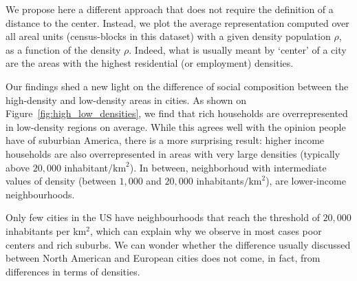 We propose here a different approach that does not require the
definition of a distance to the center. Instead, we plot the average
representation computed over all areal units (census-blocks in this
dataset) with a given density population $\rho$, as a function of the density
$\rho$. Indeed, what is usually meant by `center' of a city are the areas with
the highest residential (or employment) densities. 

Our findings shed a new light on the difference of social composition
between the high-density and low-density areas in cities. As shown on
Figure~\ref{fig:high_low_densities}, we find that rich households are
overrepresented in low-density regions on average. While this agrees well with
the opinion people have of suburbian America, there is a more surprising result:
higher income households are also overrepresented in areas with very large densities
(typically above $20,000$ inhabitant$/\text{km}^2$). In between, neighborhoud
with intermediate values of density (between $1,000$ and $20,000$
inhabitants$/\text{km}^2$), are lower-income neighbourhoods. 

Only few cities in the US have neighbourhoods that reach the threshold of
$20,000$ inhabitants per km$^2$, which can explain why we observe in most cases
poor centers and rich suburbs. We can wonder whether the difference usually
discussed between North American and European cities does not come, in fact,
from differences in terms of densities. 

